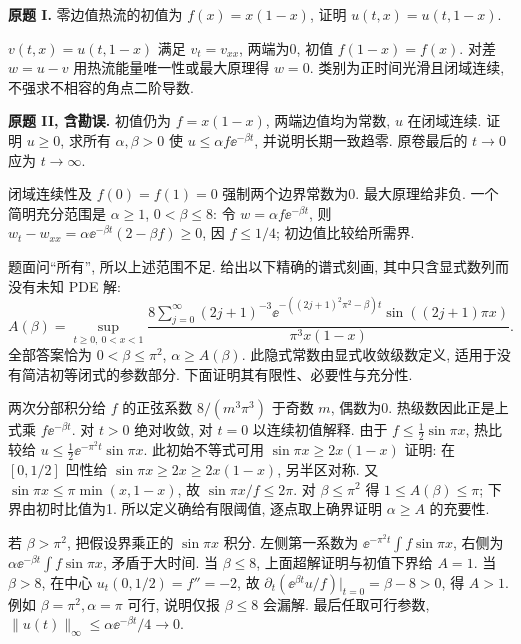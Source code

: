 \begin{exercise}\label{ps:3I}
\textbf{原题 I.} 零边值热流的初值为 $f(x)=x(1-x)$, 证明 $u(t,x)=u(t,1-x)$.
\end{exercise}
\begin{solution}
$v(t,x)=u(t,1-x)$ 满足 $v_t=v_{xx}$, 两端为0, 初值 $f(1-x)=f(x)$. 对差 $w=u-v$ 用热流能量唯一性或最大原理得 $w=0$. 类别为正时间光滑且闭域连续, 不强求不相容的角点二阶导数.
\end{solution}
\begin{exercise}\label{ps:3II}
\textbf{原题 II, 含勘误.} 初值仍为 $f=x(1-x)$, 两端边值均为常数, $u$ 在闭域连续. 证明 $u\ge0$, 求所有 $\alpha,\beta>0$ 使 $u\le\alpha f\ee^{-\beta t}$, 并说明长期一致趋零. 原卷最后的 $t\to0$ 应为 $t\to\infty$.
\end{exercise}
\begin{solution}
闭域连续性及 $f(0)=f(1)=0$ 强制两个边界常数为0. 最大原理给非负. 一个简明充分范围是 $\alpha\ge1$, $0<\beta\le8$: 令 $w=\alpha f\ee^{-\beta t}$, 则 $w_t-w_{xx}=\alpha\ee^{-\beta t}(2-\beta f)\ge0$, 因 $f\le1/4$; 初边值比较给所需界.

题面问“所有”, 所以上述范围不足. 给出以下精确的谱式刻画, 其中只含显式数列而没有未知 PDE 解:
\[
A(\beta)=\sup_{t\ge0,\ 0<x<1}
\frac{8\sum_{j=0}^\infty(2j+1)^{-3}\ee^{-((2j+1)^2\pi^2-\beta)t}\sin((2j+1)\pi x)}{\pi^3x(1-x)}.
\]
全部答案恰为 $0<\beta\le\pi^2$, $\alpha\ge A(\beta)$. 此隐式常数由显式收敛级数定义, 适用于没有简洁初等闭式的参数部分. 下面证明其有限性、必要性与充分性.

两次分部积分给 $f$ 的正弦系数 $8/(m^3\pi^3)$ 于奇数 $m$, 偶数为0. 热级数因此正是上式乘 $f\ee^{-\beta t}$. 对 $t>0$ 绝对收敛, 对 $t=0$ 以连续初值解释. 由于 $f\le\tfrac12\sin\pi x$, 热比较给 $u\le\tfrac12\ee^{-\pi^2t}\sin\pi x$. 此初始不等式可用 $\sin\pi x\ge2x(1-x)$ 证明: 在 $[0,1/2]$ 凹性给 $\sin\pi x\ge2x\ge2x(1-x)$, 另半区对称. 又 $\sin\pi x\le\pi\min(x,1-x)$, 故 $\sin\pi x/f\le2\pi$. 对 $\beta\le\pi^2$ 得 $1\le A(\beta)\le\pi$; 下界由初时比值为1. 所以定义确给有限阈值, 逐点取上确界证明 $\alpha\ge A$ 的充要性.

若 $\beta>\pi^2$, 把假设界乘正的 $\sin\pi x$ 积分. 左侧第一系数为 $\ee^{-\pi^2t}\int f\sin\pi x$, 右侧为 $\alpha\ee^{-\beta t}\int f\sin\pi x$, 矛盾于大时间. 当 $\beta\le8$, 上面超解证明与初值下界给 $A=1$. 当 $\beta>8$, 在中心 $u_t(0,1/2)=f''=-2$, 故 $\partial_t(\ee^{\beta t}u/f)|_{t=0}=\beta-8>0$, 得 $A>1$. 例如 $\beta=\pi^2,\alpha=\pi$ 可行, 说明仅报 $\beta\le8$ 会漏解. 最后任取可行参数, $\|u(t)\|_\infty\le\alpha\ee^{-\beta t}/4\to0$.
\end{solution}
